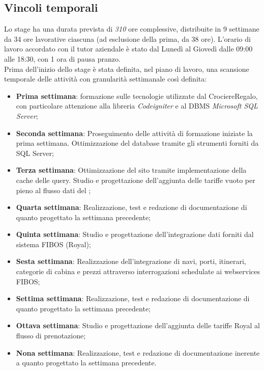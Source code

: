 \subsection{Vincoli temporali}
\label{sec:vincoli-temporali}
Lo stage ha una durata prevista di \textit{310} ore complessive, distribuite in 9 settimane da 34 ore lavorative ciascuna (ad esclusione della prima, da 38 ore). L'orario di lavoro accordato con il tutor aziendale è stato dal Lunedì al Giovedì dalle 09:00 alle 18:30, con 1 ora di pausa pranzo. \\
Prima dell'inizio dello stage è stata definita, nel piano di lavoro, una scansione temporale delle attività con granularità settimanale così definita:
\begin{itemize}
	\item \textbf{Prima settimana}: formazione sulle tecnologie utilizzate dal \bookingEngine\hphantom{i}CrociereRegalo, con particolare attenzione alla libreria \textit{Codeigniter} e al \gls{DBMS} \textit{Microsoft SQL Server};
	\item \textbf{Seconda settimana}: Proseguimento delle attività di formazione iniziate la prima settimana. Ottimizzazione del database tramite gli strumenti forniti da SQL Server;
	\item \textbf{Terza settimana}: Ottimizzazione del sito tramite implementazione della cache delle query. Studio e progettazione dell'aggiunta delle tariffe vuoto per pieno al flusso dati del \bookingEngine;
	\item \textbf{Quarta settimana}: Realizzazione, test e redazione di documentazione di quanto progettato la settimana precedente;
	\item \textbf{Quinta settimana}: Studio e progettazione dell'integrazione dati forniti dal sistema FIBOS (Royal);
	\item \textbf{Sesta settimana}: Realizzazione dell'integrazione di navi, porti, itinerari, categorie di cabina e prezzi attraverso interrogazioni schedulate ai \glspl{webservice} FIBOS;
	\item \textbf{Settima settimana}: Realizzazione, test e redazione di documentazione di quanto progettato la settimana precedente;
	\item \textbf{Ottava settimana}: Studio e progettazione dell'aggiunta delle tariffe Royal al flusso di prenotazione;
	\item \textbf{Nona settimana}: Realizzazione, test e redazione di documentazione inerente a quanto progettato la settimana precedente.
\end{itemize}

